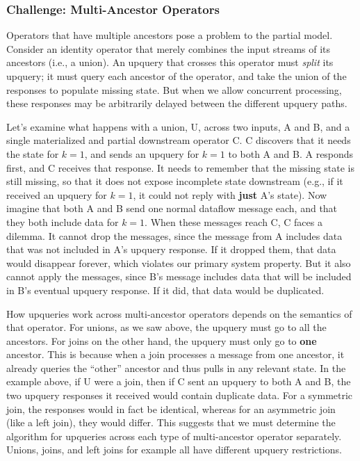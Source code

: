 \documentclass[fontsize=12pt,paper=letter]{scrartcl}
\begin{document}
\subsubsection{Challenge: Multi-Ancestor Operators}

Operators that have multiple ancestors pose a problem to the partial
model. Consider an identity operator that merely combines the input
streams of its ancestors (i.e., a union). An upquery that crosses this
operator must \emph{split} its upquery; it must query each ancestor of the
operator, and take the union of the responses to populate missing state.
But when we allow concurrent processing, these responses may be
arbitrarily delayed between the different upquery paths.

Let's examine what happens with a union, U, across two inputs, A and B,
and a single materialized and partial downstream operator C. C discovers
that it needs the state for $k = 1$, and sends an upquery for $k = 1$ to
both A and B. A responds first, and C receives that response. It needs
to remember that the missing state is still missing, so that it does not
expose incomplete state downstream (e.g., if it received an upquery for
$k = 1$, it could not reply with \textbf{just} A's state). Now imagine that
both A and B send one normal dataflow message each, and that they both
include data for $k = 1$. When these messages reach C, C faces a
dilemma. It cannot drop the messages, since the message from A includes
data that was not included in A's upquery response. If it dropped them,
that data would disappear forever, which violates our primary system
property. But it also cannot apply the messages, since B's message
includes data that will be included in B's eventual upquery response. If
it did, that data would be duplicated.

How upqueries work across multi-ancestor operators depends on the
semantics of that operator. For unions, as we saw above, the upquery
must go to all the ancestors. For joins on the other hand, the upquery
must only go to \textbf{one} ancestor. This is because when a join processes
a message from one ancestor, it already queries the ``other'' ancestor and
thus pulls in any relevant state. In the example above, if U were a
join, then if C sent an upquery to both A and B, the two upquery
responses it received would contain duplicate data. For a symmetric
join, the responses would in fact be identical, whereas for an
asymmetric join (like a left join), they would differ. This suggests
that we must determine the algorithm for upqueries across each type of
multi-ancestor operator separately. Unions, joins, and left joins for
example all have different upquery restrictions.
\end{document}
